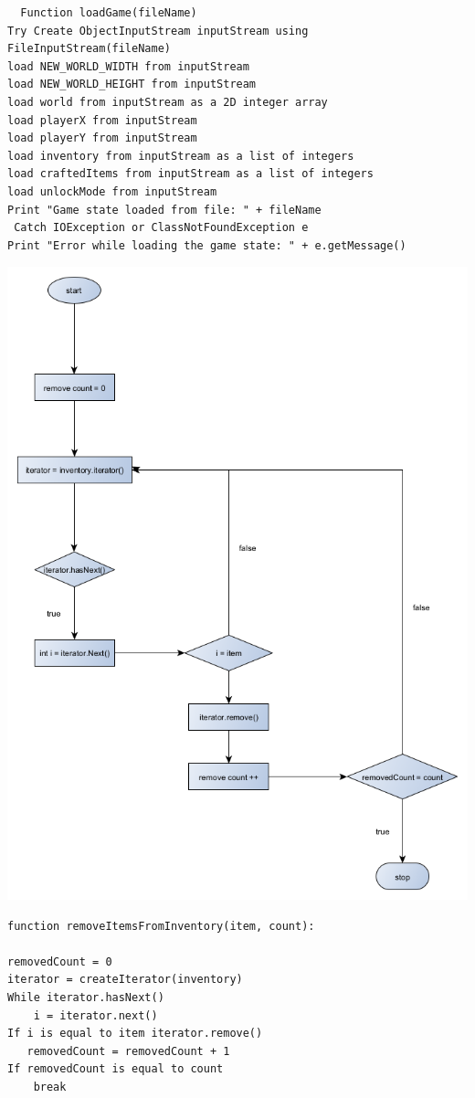 \begin{lstlisting}
  Function loadGame(fileName) 
Try Create ObjectInputStream inputStream using FileInputStream(fileName) 
load NEW_WORLD_WIDTH from inputStream 
load NEW_WORLD_HEIGHT from inputStream 
load world from inputStream as a 2D integer array 
load playerX from inputStream 
load playerY from inputStream 
load inventory from inputStream as a list of integers 
load craftedItems from inputStream as a list of integers 
load unlockMode from inputStream 
Print "Game state loaded from file: " + fileName
 Catch IOException or ClassNotFoundException e 
Print "Error while loading the game state: " + e.getMessage() 

\end{lstlisting}
{\includegraphics[width=\textwidth]{../flowchart/removeItemsFromInventory.png}}
\begin{lstlisting}
function removeItemsFromInventory(item, count):

removedCount = 0 
iterator = createIterator(inventory) 
While iterator.hasNext()
    i = iterator.next() 
If i is equal to item iterator.remove() 
   removedCount = removedCount + 1 
If removedCount is equal to count
    break
\end{lstlisting}

